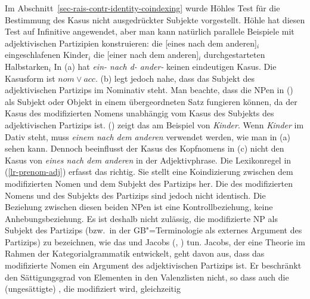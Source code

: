 {Im Abschnitt~\ref{sec-rais-contr-identity-coindexing} wurde Höhles Test \citeyearpar[Kapitel~6]{Hoehle83a}
für die Bestimmung des Kasus nicht ausgedrückter Subjekte vorgestellt. Höhle hat diesen Test auf
Infinitive angewendet, aber man kann natürlich parallele Beispiele mit adjektivischen Partizipien konstruieren:
\eal
\label{ex-subj-case-adjectival-part}
\ex
die [eines         nach  dem           anderen]$_i$ eingeschlafenen Kinder$_i$
\ex
die [einer         nach  dem           anderen]$_i$ durchgestarteten Halbstarken$_i$
\zl
In (a) hat \emph{ein- nach d- ander-} keinen eindeutigen Kasus. Die
Kasusform ist $nom \vee acc$. (b) legt jedoch nahe, dass das Subjekt des adjektivischen
Partizips im Nominativ steht. Man beachte, dass die NPen in () als Subjekt oder Objekt in
einem übergeordneten Satz fungieren können, da der Kasus des modifizierten Nomens unabhängig vom
Kasus des Subjekts des adjektivischen Partizips ist. () zeigt das am Beispiel von
\emph{Kinder}. Wenn \emph{Kinder} im Dativ steht, muss \emph{einem nach dem anderen} verwendet
werden, wie man in (a) sehen kann. Dennoch beeinflusst der Kasus des Kopfnomens in (c)
nicht den Kasus von \emph{eines nach dem anderen} in der Adjektivphrase.
\eal
{}
\zl
\largerpage[-2]
Die Lexikonregel in (\ref{lr-prenom-adj})
erfasst das richtig. Sie stellt eine Koindizierung zwischen dem modifizierten Nomen und
dem Subjekt des Partizips her. Die \synsemwe des modifizierten Nomens und des Subjekts des Partizips
sind jedoch nicht identisch. Die Beziehung zwischen diesen beiden NPen ist eine Kontrollbeziehung,
keine Anhebungsbeziehung.
Es ist deshalb nicht zulässig, die modifizierte NP als Subjekt des Partizips (bzw.\ in der
GB"=Terminologie als externes Argument des Partizips) zu bezeichnen, wie das \zb
\citet[]{LR86a} und Jacobs
(\citeyear[]{Jacobs91a}, \citeyear[]{Jacobs92a-u}) tun. Jacobs, der eine Theorie im Rahmen der
Kategorialgrammatik entwickelt, geht davon aus, dass das modifizierte
Nomen ein Argument des adjektivischen Partizips ist. Er beschränkt den Sättigungsgrad von Elementen
in den Valenzlisten nicht, so dass auch die (ungesättigte) \nbar, die modifiziert wird, gleichzeitig
}
